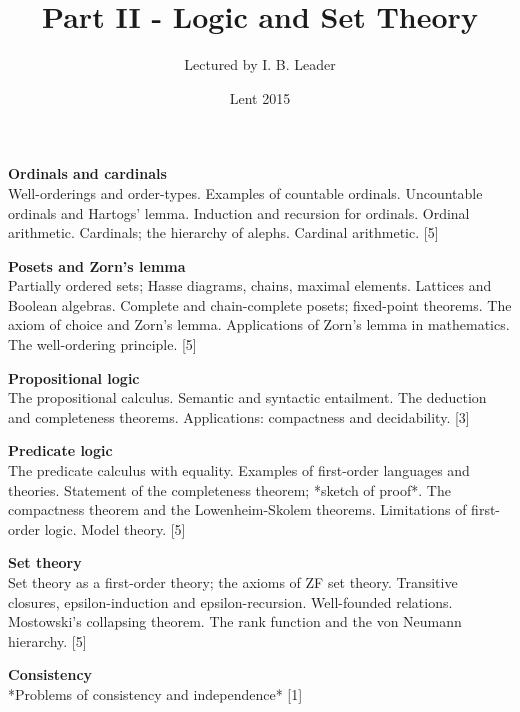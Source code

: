 \documentclass[a4paper]{article}
\title{Part II - Logic and Set Theory}
\author{Lectured by I. B. Leader}
\date{Lent 2015}
\begin{document}
\maketitle
{\small
  \noindent\textbf{Ordinals and cardinals}\\
  Well-orderings and order-types. Examples of countable ordinals. Uncountable ordinals and Hartogs' lemma. Induction and recursion for ordinals. Ordinal arithmetic. Cardinals; the hierarchy of alephs. Cardinal arithmetic.\hspace*{\fill} [5]

  \vspace{10pt}
  \noindent\textbf{Posets and Zorn's lemma}\\
  Partially ordered sets; Hasse diagrams, chains, maximal elements. Lattices and Boolean algebras. Complete and chain-complete posets; fixed-point theorems. The axiom of choice and Zorn's lemma. Applications of Zorn's lemma in mathematics. The well-ordering principle.\hspace*{\fill} [5]

  \vspace{10pt}
  \noindent\textbf{Propositional logic}\\
  The propositional calculus. Semantic and syntactic entailment. The deduction and completeness theorems. Applications: compactness and decidability.\hspace*{\fill} [3]

  \vspace{10pt}
  \noindent\textbf{Predicate logic}\\
  The predicate calculus with equality. Examples of first-order languages and theories. Statement of the completeness theorem; *sketch of proof*. The compactness theorem and the Lowenheim-Skolem theorems. Limitations of first-order logic. Model theory.\hspace*{\fill} [5]

  \vspace{10pt}
  \noindent\textbf{Set theory}\\
  Set theory as a first-order theory; the axioms of ZF set theory. Transitive closures, epsilon-induction and epsilon-recursion. Well-founded relations. Mostowski's collapsing theorem. The rank function and the von Neumann hierarchy.\hspace*{\fill} [5]
  
  \vspace{10pt}
  \noindent\textbf{Consistency}\\
  *Problems of consistency and independence*\hspace*{\fill} [1]}
\end{document}
